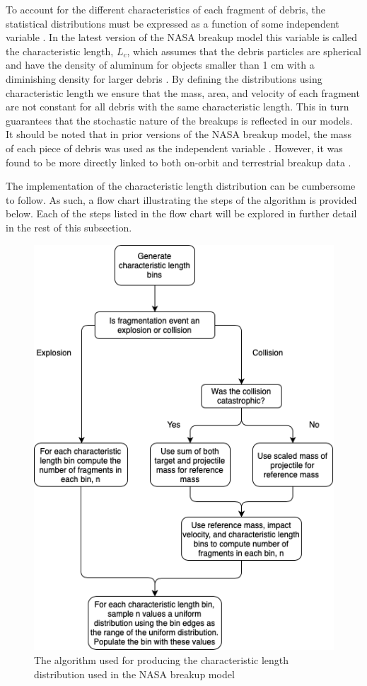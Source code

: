 \documentclass{article}
\begin{document}
To account for the different characteristics of each fragment of debris, the statistical distributions must be expressed as a function of some independent variable \citep{johnson_nasas_2001}. In the latest version of the NASA breakup model this variable is called the characteristic length, $L_c$, which assumes that the debris particles are spherical and have the density of aluminum for objects smaller than 1 cm with a diminishing density for larger debris \citep{johnson_nasas_2001}. By defining the distributions using characteristic length we ensure that the mass, area, and velocity of each fragment are not constant for all debris with the same characteristic length. This in turn guarantees that the stochastic nature of the breakups is reflected in our models. It should be noted that in prior versions of the NASA breakup model, the mass of each piece of debris was used as the independent variable \citep{krisko_proper_2011}. However, it was found to be more directly linked to both on-orbit and terrestrial breakup data \citep{johnson_nasas_2001}.

The implementation of the characteristic length distribution can be cumbersome to follow. As such, a flow chart illustrating the steps of the algorithm is provided below. Each of the steps listed in the flow chart will be explored in further detail in the rest of this subsection.

\begin{figure}[H]
	\centering
	\includegraphics[scale=0.5, trim=0cm 0cm 0cm 5cm]{L_c_flow}
	\caption{The algorithm used for producing the characteristic length distribution used in the NASA breakup model}
\end{figure}
\end{document}
